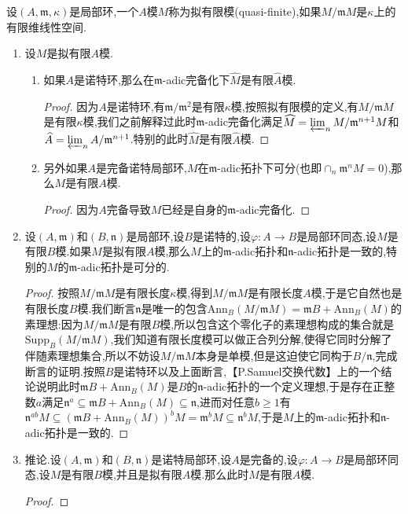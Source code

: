 设$(A,\mathfrak{m},\kappa)$是局部环,一个$A$模$M$称为拟有限模(quasi-finite),如果$M/\mathfrak{m}M$是$\kappa$上的有限维线性空间.
\begin{enumerate}
	\item 设$M$是拟有限$A$模.
	\begin{enumerate}[(1)]
		\item 如果$A$是诺特环,那么在$\mathfrak{m}$-adic完备化下$\widehat{M}$是有限$\widehat{A}$模.
		\begin{proof}
			
			因为$A$是诺特环,有$\mathfrak{m}/\mathfrak{m}^2$是有限$\kappa$模,按照拟有限模的定义,有$M/\mathfrak{m}M$是有限$\kappa$模,我们之前解释过此时$\mathfrak{m}$-adic完备化满足$\widehat{M}=\varprojlim_nM/\mathfrak{m}^{n+1}M$和$\widehat{A}=\varprojlim_nA/\mathfrak{m}^{n+1}$.特别的此时$\widehat{M}$是有限$\widehat{A}$模.
		\end{proof}
		\item 另外如果$A$是完备诺特局部环,$M$在$\mathfrak{m}$-adic拓扑下可分(也即$\cap_n\mathfrak{m}^nM=0$),那么$M$是有限$A$模.
		\begin{proof}
			
			因为$A$完备导致$M$已经是自身的$\mathfrak{m}$-adic完备化.
		\end{proof}
	\end{enumerate}
    \item 设$(A,\mathfrak{m})$和$(B,\mathfrak{n})$是局部环,设$B$是诺特的,设$\varphi:A\to B$是局部环同态,设$M$是有限$B$模.如果$M$是拟有限$A$模,那么$M$上的$\mathfrak{m}$-adic拓扑和$\mathfrak{n}$-adic拓扑是一致的,特别的$M$的$\mathfrak{m}$-adic拓扑是可分的.
    \begin{proof}
    	
    	按照$M/\mathfrak{m}M$是有限长度$\kappa$模,得到$M/\mathfrak{m}M$是有限长度$A$模,于是它自然也是有限长度$B$模.我们断言$\mathfrak{n}$是唯一的包含$\mathrm{Ann}_B(M/\mathfrak{m}M)=\mathfrak{m}B+\mathrm{Ann}_B(M)$的素理想:因为$M/\mathfrak{m}M$是有限$B$模,所以包含这个零化子的素理想构成的集合就是$\mathrm{Supp}_B(M/\mathfrak{m}M)$,我们知道有限长度模可以做正合列分解,使得它同时分解了伴随素理想集合,所以不妨设$M/\mathfrak{m}M$本身是单模,但是这迫使它同构于$B/\mathfrak{n}$,完成断言的证明.按照$B$是诺特环以及上面断言,【P.Samuel交换代数】上的一个结论说明此时$\mathfrak{m}B+\mathrm{Ann}_B(M)$是$B$的$\mathfrak{n}$-adic拓扑的一个定义理想,于是存在正整数$a$满足$\mathfrak{n}^a\subseteq\mathfrak{m}B+\mathrm{Ann}_B(M)\subseteq\mathfrak{n}$,进而对任意$b\ge1$有$\mathfrak{n}^{ab}M\subseteq(\mathfrak{m}B+\mathrm{Ann}_B(M))^bM=\mathfrak{m}^bM\subseteq\mathfrak{n}^bM$,于是$M$上的$\mathfrak{m}$-adic拓扑和$\mathfrak{n}$-adic拓扑是一致的.
    \end{proof}
    \item 推论.设$(A,\mathfrak{m})$和$(B,\mathfrak{n})$是诺特局部环,设$A$是完备的,设$\varphi:A\to B$是局部环同态,设$M$是有限$B$模,并且是拟有限$A$模.那么此时$M$是有限$A$模.
    \begin{proof}
    	

\end{proof}
\end{enumerate}

